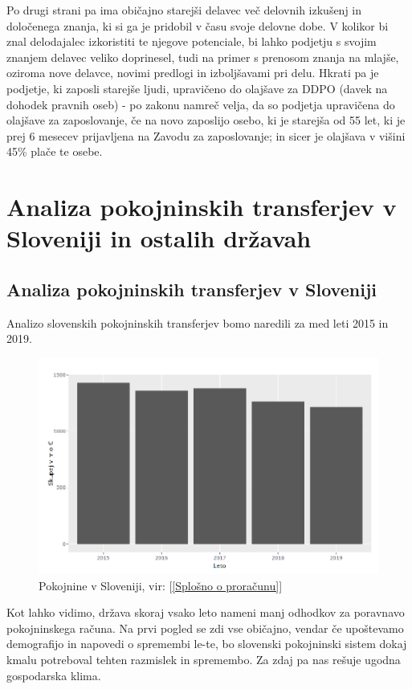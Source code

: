 \documentclass[12pt, a4paper]{article}
\begin{document}
\hspace*{5mm} Po drugi strani pa ima običajno starejši delavec več delovnih izkušenj in določenega znanja, ki si ga je pridobil v času svoje delovne dobe. V kolikor bi znal delodajalec izkoristiti te njegove potenciale, bi lahko podjetju s svojim znanjem delavec veliko doprinesel, tudi na primer s prenosom znanja na mlajše, oziroma nove delavce, novimi predlogi in izboljšavami pri delu. Hkrati pa je podjetje, ki zaposli starejše ljudi, upravičeno do olajšave za DDPO (davek na dohodek pravnih oseb) - po zakonu namreč velja, da so podjetja upravičena do olajšave za zaposlovanje, če na novo zaposlijo osebo, ki je starejša od 55 let, ki je prej 6 mesecev prijavljena na Zavodu za zaposlovanje; in sicer je olajšava v višini 45\% plače te osebe. 

\newpage
\section[Analiza pokojninskih transferjev v Sloveniji in ostalih državah]{Analiza pokojninskih transferjev v Sloveniji in ostalih državah}
\subsection{Analiza pokojninskih transferjev v Sloveniji}
\hspace*{5mm} Analizo slovenskih pokojninskih transferjev bomo naredili za med leti 2015 in 2019. 

\begin{figure}[h]
\centering
\includegraphics[height = 8 cm]{pokojnine_slovenija.png}
\caption{Pokojnine v Sloveniji, vir: [\ref{Splošno o proračunu}]}
\label{Slika 6}
\end{figure}
\hspace*{5mm} Kot lahko vidimo, država skoraj vsako leto nameni manj odhodkov za poravnavo pokojninskega računa. Na prvi pogled se zdi vse običajno, vendar če upoštevamo demografijo in napovedi o spremembi le-te, bo slovenski pokojninski sistem dokaj kmalu potreboval tehten razmislek in spremembo. Za zdaj pa nas rešuje ugodna gospodarska klima.
\end{document}
